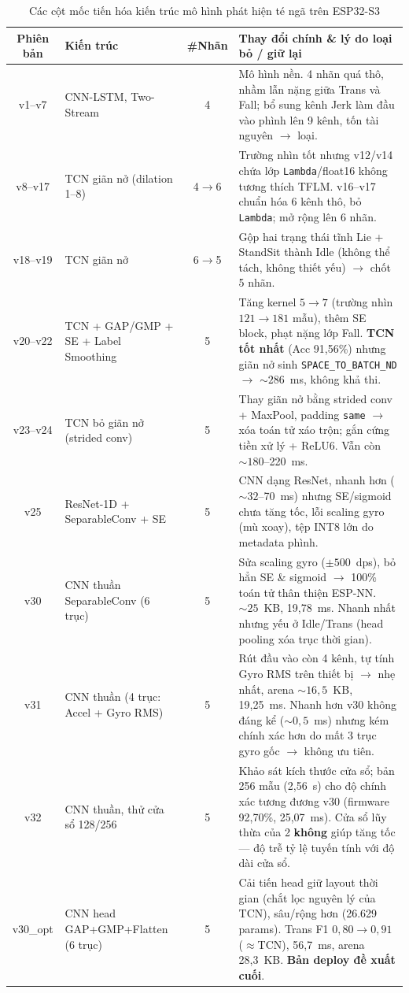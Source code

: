 \documentclass[../DoAn.tex]{subfiles}
\begin{document}
\begin{table}[H]
\centering
\caption{Các cột mốc tiến hóa kiến trúc mô hình phát hiện té ngã trên ESP32-S3}
\label{tab:model_evolution}
\footnotesize
\setlength{\tabcolsep}{3pt}
\begin{tabular}{|c|p{2.9cm}|c|p{7.4cm}|}
\hline
\textbf{Phiên bản} & \textbf{Kiến trúc} & \textbf{\#Nhãn} & \textbf{Thay đổi chính \& lý do loại bỏ / giữ lại} \\
\hline
v1--v7   & CNN-LSTM, Two-Stream & 4 & Mô hình nền. 4 nhãn quá thô, nhầm lẫn nặng giữa Trans và Fall; bổ sung kênh Jerk làm đầu vào phình lên 9 kênh, tốn tài nguyên $\rightarrow$ loại. \\
\hline
v8--v17  & TCN giãn nở (dilation 1--8) & 4$\rightarrow$6 & Trường nhìn tốt nhưng v12/v14 chứa lớp \texttt{Lambda}/float16 không tương thích TFLM. v16--v17 chuẩn hóa 6 kênh thô, bỏ \texttt{Lambda}; mở rộng lên 6 nhãn. \\
\hline
v18--v19 & TCN giãn nở & 6$\rightarrow$5 & Gộp hai trạng thái tĩnh Lie + StandSit thành Idle (không thể tách, không thiết yếu) $\rightarrow$ chốt 5 nhãn. \\
\hline
v20--v22 & TCN + GAP/GMP + SE + Label Smoothing & 5 & Tăng kernel $5\rightarrow7$ (trường nhìn $121\rightarrow181$ mẫu), thêm SE block, phạt nặng lớp Fall. \textbf{TCN tốt nhất} (Acc 91,56\%) nhưng giãn nở sinh \texttt{SPACE\_TO\_BATCH\_ND} $\rightarrow$ $\sim 286$~ms, không khả thi. \\
\hline
v23--v24 & TCN bỏ giãn nở (strided conv) & 5 & Thay giãn nở bằng strided conv + MaxPool, padding \texttt{same} $\rightarrow$ xóa toán tử xáo trộn; gắn cứng tiền xử lý + ReLU6. Vẫn còn $\sim 180$--220~ms. \\
\hline
v25      & ResNet-1D + SeparableConv + SE & 5 & CNN dạng ResNet, nhanh hơn ($\sim 32$--70~ms) nhưng SE/sigmoid chưa tăng tốc, lỗi scaling gyro (mù xoay), tệp INT8 lớn do metadata phình. \\
\hline
v30      & CNN thuần SeparableConv (6 trục) & 5 & Sửa scaling gyro ($\pm 500$~dps), bỏ hẳn SE \& sigmoid $\rightarrow$ 100\% toán tử thân thiện ESP-NN. $\sim 25$~KB, 19,78~ms. Nhanh nhất nhưng yếu ở Idle/Trans (head pooling xóa trục thời gian). \\
\hline
v31      & CNN thuần (4 trục: Accel + Gyro RMS) & 5 & Rút đầu vào còn 4 kênh, tự tính Gyro RMS trên thiết bị $\rightarrow$ nhẹ nhất, arena $\sim 16{,}5$~KB, 19,25~ms. Nhanh hơn v30 không đáng kể ($\sim 0{,}5$~ms) nhưng kém chính xác hơn do mất 3 trục gyro gốc $\rightarrow$ không ưu tiên. \\
\hline
v32      & CNN thuần, thử cửa sổ 128/256 & 5 & Khảo sát kích thước cửa sổ; bản 256 mẫu (2,56~s) cho độ chính xác tương đương v30 (firmware 92,70\%, 25,07~ms). Cửa sổ lũy thừa của 2 \textbf{không} giúp tăng tốc --- độ trễ tỷ lệ tuyến tính với độ dài cửa sổ. \\
\hline
v30\_opt & CNN head GAP+GMP+Flatten (6 trục) & 5 & Cải tiến head giữ layout thời gian (chắt lọc nguyên lý của TCN), sâu/rộng hơn (26.629 params). Trans F1 $0{,}80\rightarrow0{,}91$ ($\approx$TCN), 56,7~ms, arena 28,3~KB. \textbf{Bản deploy đề xuất cuối}. \\
\hline
\end{tabular}
\end{table}
\end{document}
